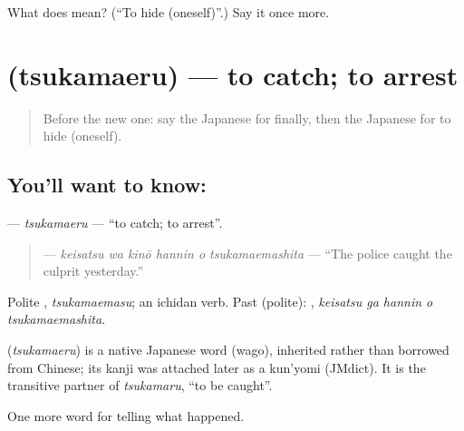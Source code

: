 \begin{tcolorbox}[breakable,colback=teal!4,colframe=teal!35!black,title={Before you move on}]
What does  mean? (\textquotedblleft{}To hide (oneself)\textquotedblright{}.) Say it once more.
\end{tcolorbox}
\section[\texorpdfstring{\ja{つかまえる} (tsukamaeru)}{つかまえる (tsukamaeru)}]{ (tsukamaeru) — to catch; to arrest}

\label{lesson:JA-C271-tsukamaeru}



\begin{quote}
Before the new one: say the Japanese for finally, then the Japanese for to hide (oneself).
\end{quote}

\subsection*{You'll want to know: }
\textbf{} — \emph{tsukamaeru} — \textquotedblleft{}to catch; to arrest\textquotedblright{}.

\begin{quote}
\textbf{   } — \emph{keisatsu wa kinō hannin o tsukamaemashita} — \textquotedblleft{}The police caught the culprit yesterday.\textquotedblright{}
\end{quote}

Polite \textbf{}, \emph{tsukamaemasu}; an ichidan verb. Past (polite): \textbf{  }, \emph{keisatsu ga hannin o tsukamaemashita}.

\begin{cousinweb}
\textbf{} (\emph{tsukamaeru}) is a native Japanese word (wago), inherited rather than borrowed from Chinese; its kanji was attached later as a kun'yomi (JMdict). It is the transitive partner of \emph{tsukamaru}, \textquotedblleft{}to be caught\textquotedblright{}.
\end{cousinweb}

\begin{grammarlens}[title={What you've built}]
One more word for telling what happened.
\end{grammarlens}

